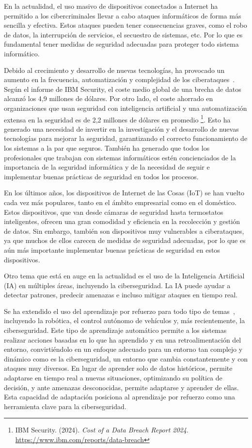 
En la actualidad, el uso masivo de dispositivos conectados a Internet ha permitido a los cibercriminales llevar a cabo ataques informáticos de forma más sencilla y efectiva. Estos ataques pueden tener consecuencias graves, como el robo de datos, la interrupción de servicios, el secuestro de sistemas, etc. Por lo que es fundamental tener medidas de seguridad adecuadas para proteger todo sistema informático.

Debido al crecimiento y desarrollo de nuevas tecnologías, ha provocado un aumento en la frecuencia, automatización y complejidad de los ciberataques~\cite{Li2021}. Según el informe de IBM Security, el coste medio global de una brecha de datos alcanzó los 4,9 millones de dólares. Por otro lado, el coste ahorrado en organizaciones que usan seguridad con inteligencia artificial y una automatización extensa en la seguridad es de 2,2 millones de dólares en promedio \footnote{IBM Security. (2024). \textit{Cost of a Data Breach Report 2024}. \url{https://www.ibm.com/reports/data-breach}}. Esto ha generado una necesidad de invertir en la investigación y el desarrollo de nuevas tecnologías para mejorar la seguridad, garantizando el correcto funcionamiento de los sistemas a la par que seguros. También ha generado que todos los profesionales que trabajan con sistemas informáticos estén concienciados de la importancia de la seguridad informática y de la necesidad de seguir e implementar buenas prácticas de seguridad en todos los procesos.

En los últimos años, los dispositivos de Internet de las Cosas (IoT) se han vuelto cada vez más populares, tanto en el ámbito empresarial como en el doméstico. Estos dispositivos, que van desde cámaras de seguridad hasta termostatos inteligentes, ofrecen una gran comodidad y eficiencia en la recolección y gestión de datos. Sin embargo, también son dispositivos muy vulnerables a ciberataques, ya que muchos de ellos carecen de medidas de seguridad adecuadas, por lo que es aún más importante implementar buenas prácticas de seguridad en estos dispositivos.

Otro tema que está en auge en la actualidad es el uso de la Inteligencia Artificial (IA) en múltiples áreas, incluyendo la ciberseguridad. La IA puede ayudar a detectar patrones, predecir amenazas e incluso mitigar ataques en tiempo real.

Se ha extendido el uso del aprendizaje por refuerzo para todo tipo de temas~\cite{Matsuo2022}, incluyendo la robótica, el control autónomo de vehículos y, más recientemente, la ciberseguridad. Este tipo de aprendizaje automático permite a los sistemas realizar acciones basadas en lo que ha aprendido y en una retroalimentación del entorno, convirtiéndolo en un enfoque adecuado para un entorno tan complejo y dinámico como es la ciberseguridad, un entorno que cambia constantemente y con ataques muy diversos.
En lugar de aprender solo de datos históricos, permite adaptarse en tiempo real a nuevas situaciones, optimizando su política de decisión, y ante amenazas desconocidas, permite adaptarse y aprender de ellas. Esta capacidad de adaptación posiciona al aprendizaje por refuerzo como una herramienta clave para la ciberseguridad.

